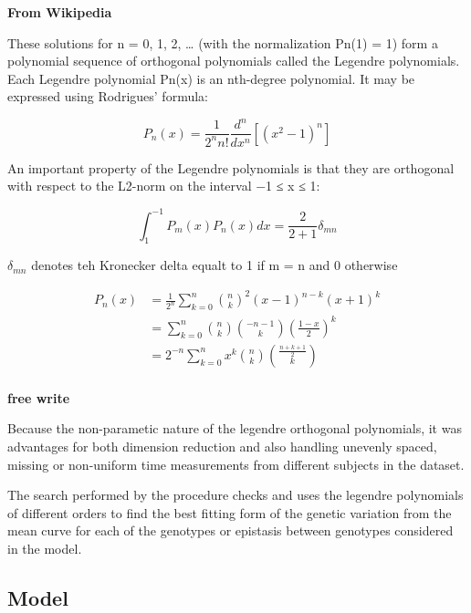 \documentclass[11pt,]{book}
\theoremstyle{definition}
\theoremstyle{definition}
\theoremstyle{remark}
\begin{document}
\textbf{From Wikipedia}

These solutions for n = 0, 1, 2, \ldots{} (with the normalization Pn(1)
= 1) form a polynomial sequence of orthogonal polynomials called the
Legendre polynomials. Each Legendre polynomial Pn(x) is an nth-degree
polynomial. It may be expressed using Rodrigues' formula:

\begin{equation}
P_n(x) = \frac{1}{2^nn!} \frac{d^n}{dx^n}[(x^2-1)^n]
\label{eq:rodrigues-formula}
\end{equation}

An important property of the Legendre polynomials is that they are
orthogonal with respect to the L2-norm on the interval −1 ≤ x ≤ 1:

\begin{equation}
\int_1^{-1} P_m(x)P_n(x)dx = \frac{2}{2+1}\delta_{mn}
\label{eq:orthg-leg}
\end{equation}

\(\delta_{mn}\) denotes teh Kronecker delta equalt to 1 if m = n and 0
otherwise

\begin{equation}
\begin{split}
P_n(x) & = \frac{1}{2^n}\sum_{k=0}^{n}{{n}\choose{k}}^2(x-1)^{n-k}(x+1)^k \\
& = \sum_{k=0}^{n}{{n}\choose{k}}{{-n-1}\choose{k}}{\left(\frac{1-x}{2}\right)}^k \\
& = 2^{-n}\sum_{k=0}^{n} x^k {{n}\choose{k}}{{\frac{n+k+1}{2}}\choose{k}} \\
\end{split}
\label{eq:leg-eq}
\end{equation}

\textbf{free write}

Because the non-parametic nature of the legendre orthogonal polynomials,
it was advantages for both dimension reduction and also handling
unevenly spaced, missing or non-uniform time measurements from different
subjects in the dataset.

The search performed by the procedure checks and uses the legendre
polynomials of different orders to find the best fitting form of the
genetic variation from the mean curve for each of the genotypes or
epistasis between genotypes considered in the model.

\subsection{Model}\label{model}
\end{document}

